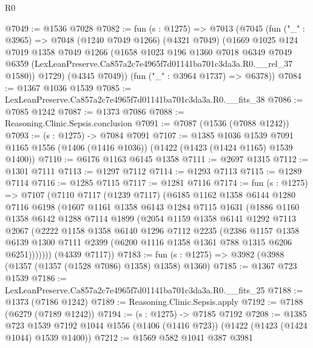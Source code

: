 \begin{lexlean}{R0}
\begin{coremodule}
@7049 := @1536 @7028
@7082 := fun (s : @1275) =>
  @7013
    (@7045
      (fun ("_" : @3965) =>
      @7048
        (@1240 @7049 @1266)
        (@4321 @7049)
        (@1669
          @1025
          @124
          @7019
          @1358
          @7049
          @1266
          (@1658
            @1023
            @196
            @1360
            @7018
            @6349
            @7049
            @6359
            (LexLeanPreserve.Ca857a2c7e4965f7d01141ba701c3da3a.R0.__rel_37 @1580))
          @1729)
        (@4345 @7049))
      (fun ("_" : @3964 @1737) => @6378))
@7084 := @1367 @1036 @1539
@7085 := LexLeanPreserve.Ca857a2c7e4965f7d01141ba701c3da3a.R0.__fits_38
@7086 := @7085 @1242
@7087 := @1373 @7086
@7088 := Reasoning.Clinic.Sepsis.conclusion
@7091 := @7087 (@1536 (@7088 @1242))
@7093 := (s : @1275) -> @7084 @7091
@7107 := @1385
    @1036
    @1539
    @7091
    @1165
    @1556
    (@1406 (@1416 @1036))
    (@1422 (@1423 (@1424 @1165) @1539 @1400))
@7110 := @6176 @1163 @6145 @1358
@7111 := @2697 @1315
@7112 := @1301 @7111
@7113 := @1297 @7112
@7114 := @1293 @7113
@7115 := @1289 @7114
@7116 := @1285 @7115
@7117 := @1281 @7116
@7174 := fun (s : @1275) =>
  @7107
    (@7110
      @7117
      (@1239 @7117)
      (@6185
        @1162
        @1358
        @6144
        @1280
        @7116
        @6198
        (@1607
          @1161
          @1358
          @6143
          @1284
          @7115
          @1631
          (@1886
            @1160
            @1358
            @6142
            @1288
            @7114
            @1899
            (@2054
              @1159
              @1358
              @6141
              @1292
              @7113
              @2067
              (@2222
                @1158
                @1358
                @6140
                @1296
                @7112
                @2235
                (@2386
                  @1157
                  @1358
                  @6139
                  @1300
                  @7111
                  @2399
                  (@6200 @1116 @1358 @1361 @788 @1315 @6206 @6251)))))))
      (@4339 @7117))
@7183 := fun (s : @1275) => @3982 (@3988 (@1357 (@1357 (@1528 @7086) @1358) @1358) @1360)
@7185 := @1367 @723 @1539
@7186 := LexLeanPreserve.Ca857a2c7e4965f7d01141ba701c3da3a.R0.__fits_25
@7188 := @1373 (@7186 @1242)
@7189 := Reasoning.Clinic.Sepsis.apply
@7192 := @7188 (@6279 (@7189 @1242))
@7194 := (s : @1275) -> @7185 @7192
@7208 := @1385
    @723
    @1539
    @7192
    @1044
    @1556
    (@1406 (@1416 @723))
    (@1422 (@1423 (@1424 @1044) @1539 @1400))
@7212 := @1569 @582 @1041 @387 @3981

\end{coremodule}
\end{lexlean}
